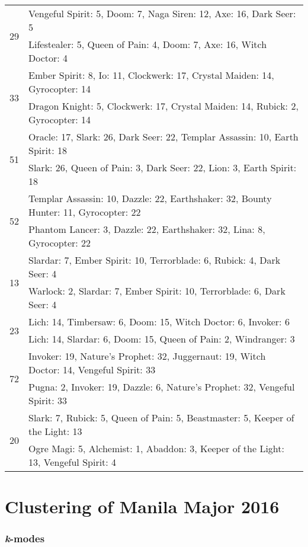 \documentclass[result.tex]{subfiles}
\begin{document}
\begin{table}[H]
\begin{tabular}{ | c | p{12.5cm} | }
\hline
\multirow{2}{*}{29}
& Vengeful Spirit: 5, Doom: 7, Naga Siren: 12, Axe: 16, Dark Seer: 5 \\
& Lifestealer: 5, Queen of Pain: 4, Doom: 7, Axe: 16, Witch Doctor: 4 \\
\hline
\multirow{2}{*}{33}
& Ember Spirit: 8, Io: 11, Clockwerk: 17, Crystal Maiden: 14, Gyrocopter: 14 \\
& Dragon Knight: 5, Clockwerk: 17, Crystal Maiden: 14, Rubick: 2, Gyrocopter: 14 \\
\hline
\multirow{2}{*}{51}
& Oracle: 17, Slark: 26, Dark Seer: 22, Templar Assassin: 10, Earth Spirit: 18 \\
& Slark: 26, Queen of Pain: 3, Dark Seer: 22, Lion: 3, Earth Spirit: 18 \\
\hline
\multirow{2}{*}{52}
& Templar Assassin: 10, Dazzle: 22, Earthshaker: 32, Bounty Hunter: 11, Gyrocopter: 22 \\
& Phantom Lancer: 3, Dazzle: 22, Earthshaker: 32, Lina: 8, Gyrocopter: 22 \\
\hline
\multirow{2}{*}{13}
& Slardar: 7, Ember Spirit: 10, Terrorblade: 6, Rubick: 4, Dark Seer: 4 \\
& Warlock: 2, Slardar: 7, Ember Spirit: 10, Terrorblade: 6, Dark Seer: 4 \\
\hline
\multirow{2}{*}{23}
& Lich: 14, Timbersaw: 6, Doom: 15, Witch Doctor: 6, Invoker: 6 \\
& Lich: 14, Slardar: 6, Doom: 15, Queen of Pain: 2, Windranger: 3 \\
\hline
\multirow{2}{*}{72}
& Invoker: 19, Nature's Prophet: 32, Juggernaut: 19, Witch Doctor: 14, Vengeful Spirit: 33 \\
& Pugna: 2, Invoker: 19, Dazzle: 6, Nature's Prophet: 32, Vengeful Spirit: 33 \\
\hline
\multirow{2}{*}{20}
& Slark: 7, Rubick: 5, Queen of Pain: 5, Beastmaster: 5, Keeper of the Light: 13 \\
& Ogre Magi: 5, Alchemist: 1, Abaddon: 3, Keeper of the Light: 13, Vengeful Spirit: 4 \\
\hline
    \end{tabular}
    \caption{}
    \label{}
    \end{table}

\clearpage
\section*{Clustering of Manila Major 2016}

\subsubsection*{\textit{k}-modes}
\end{document}

